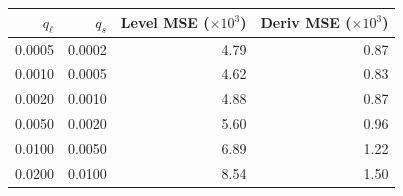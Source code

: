 \begin{tabular}{rr rr}
\toprule
$q_\ell$ & $q_s$ & Level MSE ($\times 10^3$) & Deriv MSE ($\times 10^3$) \\
\midrule
0.0005 & 0.0002 & 4.79 & 0.87 \\
0.0010 & 0.0005 & 4.62 & 0.83 \\
0.0020 & 0.0010 & 4.88 & 0.87 \\
0.0050 & 0.0020 & 5.60 & 0.96 \\
0.0100 & 0.0050 & 6.89 & 1.22 \\
0.0200 & 0.0100 & 8.54 & 1.50 \\
\bottomrule
\end{tabular}
